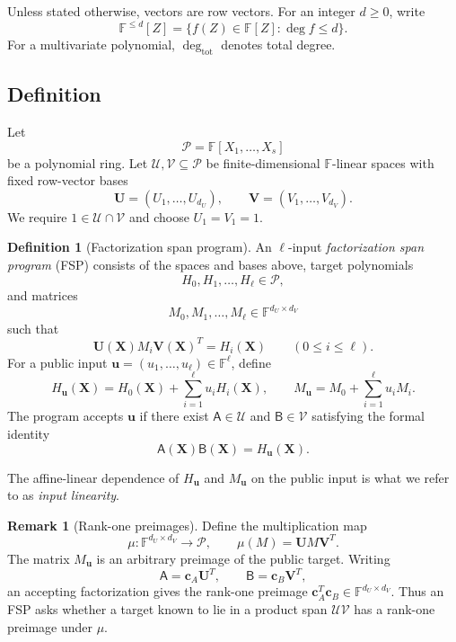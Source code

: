 \documentclass[11pt]{article}
\theoremstyle{definition}
\newtheorem{definition}[theorem]{Definition}
\newtheorem{remark}[theorem]{Remark}
\newcommand{\F}{\mathbb F}
\newcommand{\cU}{\mathcal U}
\newcommand{\cV}{\mathcal V}
\newcommand{\cP}{\mathcal P}
\begin{document}
Unless stated otherwise, vectors are row vectors.  For an integer $d\ge0$,
write
\[
  \F^{\le d}[Z]=\{f(Z)\in\F[Z]:\deg f\le d\}.
\]
For a multivariate polynomial, $\deg_{\mathrm{tot}}$ denotes total degree.

\subsection{Definition}

Let
\[
  \cP=\F[X_1,\ldots,X_s]
\]
be a polynomial ring.  Let $\cU,\cV\subseteq\cP$ be finite-dimensional
$\F$-linear spaces with fixed row-vector bases
\[
  \mathbf U=(U_1,\ldots,U_{d_U}),
  \qquad
  \mathbf V=(V_1,\ldots,V_{d_V}).
\]
We require $1\in\cU\cap\cV$ and choose $U_1=V_1=1$.

\begin{definition}[Factorization span program]
\label{def:fsp}
An $\ell$-input \emph{factorization span program} (FSP) consists of the
spaces and bases above, target polynomials
\[
  H_0,H_1,\ldots,H_\ell\in\cP,
\]
and matrices
\[
  M_0,M_1,\ldots,M_\ell\in\F^{d_U\times d_V}
\]
such that
\begin{equation}
  \mathbf U(\mathbf X)M_i\mathbf V(\mathbf X)^T=H_i(\mathbf X)
  \qquad (0\le i\le\ell).
  \label{eq:fsp-target-representations}
\end{equation}
For a public input $\mathbf u=(u_1,\ldots,u_\ell)\in\F^\ell$, define
\begin{equation}
  H_{\mathbf u}(\mathbf X)
  =H_0(\mathbf X)+\sum_{i=1}^{\ell}u_iH_i(\mathbf X),
  \qquad
  M_{\mathbf u}=M_0+\sum_{i=1}^{\ell}u_iM_i.
  \label{eq:fsp-input-target}
\end{equation}
The program accepts $\mathbf u$ if there exist
$\mathsf A\in\cU$ and $\mathsf B\in\cV$ satisfying the formal identity
\begin{equation}
  \mathsf A(\mathbf X)\mathsf B(\mathbf X)
  =H_{\mathbf u}(\mathbf X).
  \label{eq:fsp-factorization}
\end{equation}
\end{definition}

The affine-linear dependence of $H_{\mathbf u}$ and $M_{\mathbf u}$ on the
public input is what we refer to as \emph{input linearity}.

\begin{remark}[Rank-one preimages]
Define the multiplication map
\[
  \mu:\F^{d_U\times d_V}\longrightarrow\cP,
  \qquad
  \mu(M)=\mathbf U M\mathbf V^T.
\]
The matrix $M_{\mathbf u}$ is an arbitrary preimage of the public target.
Writing
\[
  \mathsf A=\mathbf c_A\mathbf U^T,
  \qquad
  \mathsf B=\mathbf c_B\mathbf V^T,
\]
an accepting factorization gives the rank-one preimage
$\mathbf c_A^T\mathbf c_B\in\F^{d_U\times d_V}$.  Thus an FSP asks whether a
target known to lie in a product span $\cU \cV$ has a rank-one preimage under $\mu$.
\end{remark}
\end{document}
